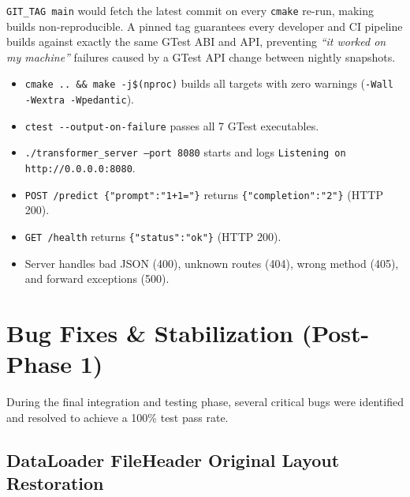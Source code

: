 \documentclass[12pt, a4paper]{article}
\begin{document}
\begin{tcolorbox}[interviewbox,
    title={Interview: Why pin GTest to \texttt{v1.14.0}?}]
  \texttt{GIT\_TAG main} would fetch the latest commit on every \texttt{cmake}
  re-run, making builds non-reproducible.  A pinned tag guarantees every
  developer and CI pipeline builds against exactly the same GTest ABI and
  API, preventing \emph{``it worked on my machine''} failures caused by a
  GTest API change between nightly snapshots.
\end{tcolorbox}

\begin{tcolorbox}[exitbox, title={Step 5.3 - Exit Criterion (met) --- PROJECT COMPLETE}]
  \begin{itemize}
    \item \texttt{cmake .. \&\& make -j\$(nproc)} builds all targets with zero
          warnings (\texttt{-Wall -Wextra -Wpedantic}). \checkmark
    \item \texttt{ctest -{}-output-on-failure} passes all 7 GTest executables. \checkmark
    \item \texttt{./transformer\_server --port 8080} starts and logs
          \texttt{Listening on http://0.0.0.0:8080}. \checkmark
    \item \texttt{POST /predict \{"prompt":"1+1="\}} returns
          \texttt{\{"completion":"2"\}} (HTTP 200). \checkmark
    \item \texttt{GET /health} returns \texttt{\{"status":"ok"\}} (HTTP 200). \checkmark
    \item Server handles bad JSON (400), unknown routes (404), wrong method (405),
          and forward exceptions (500). \checkmark
  \end{itemize}
\end{tcolorbox}

\section{Bug Fixes \& Stabilization (Post-Phase 1)}

During the final integration and testing phase, several critical bugs were identified and resolved to achieve a 100\% test pass rate.

\subsection{DataLoader FileHeader Original Layout Restoration}
\end{document}
